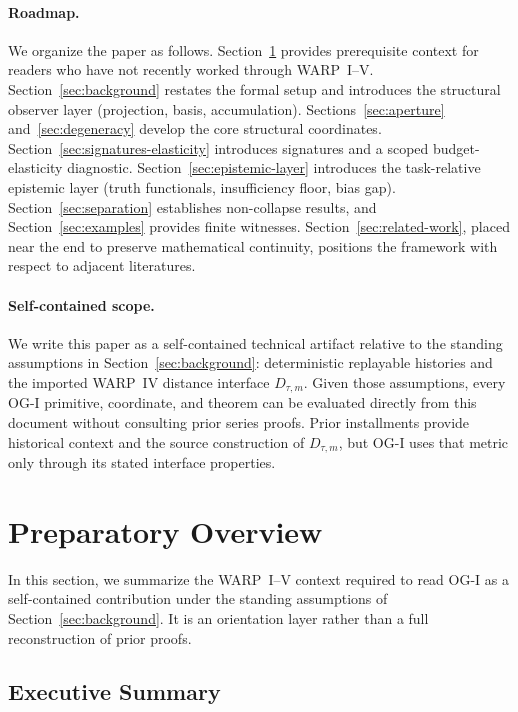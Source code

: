 \documentclass[11pt,twoside]{article}
\theoremstyle{definition}
\begin{document}
\paragraph{Roadmap.}
We organize the paper as follows. Section~\ref{sec:tldr} provides prerequisite context for readers who have not recently worked through WARP~I--V. Section~\ref{sec:background} restates the formal setup and introduces the structural observer layer (projection, basis, accumulation). Sections~\ref{sec:aperture} and~\ref{sec:degeneracy} develop the core structural coordinates. Section~\ref{sec:signatures-elasticity} introduces signatures and a scoped budget-elasticity diagnostic. Section~\ref{sec:epistemic-layer} introduces the task-relative epistemic layer (truth functionals, insufficiency floor, bias gap). Section~\ref{sec:separation} establishes non-collapse results, and Section~\ref{sec:examples} provides finite witnesses. Section~\ref{sec:related-work}, placed near the end to preserve mathematical continuity, positions the framework with respect to adjacent literatures.

\paragraph{Self-contained scope.}
We write this paper as a self-contained technical artifact relative to the standing assumptions in Section~\ref{sec:background}: deterministic replayable histories and the imported WARP~IV distance interface \(D_{\tau,m}\). Given those assumptions, every OG-I primitive, coordinate, and theorem can be evaluated directly from this document without consulting prior series proofs. Prior installments provide historical context and the source construction of \(D_{\tau,m}\), but OG-I uses that metric only through its stated interface properties.

\section{Preparatory Overview}
\label{sec:tldr}

In this section, we summarize the WARP~I--V context required to read OG-I as a self-contained contribution under the standing assumptions of Section~\ref{sec:background}. It is an orientation layer rather than a full reconstruction of prior proofs.

\subsection{Executive Summary}
\label{subsec:executive-summary}
\end{document}
